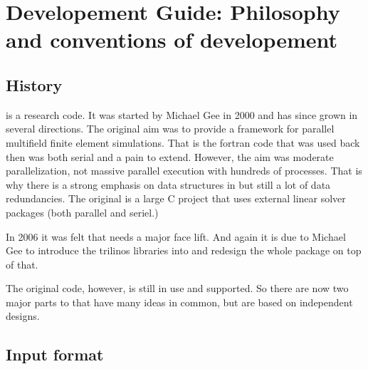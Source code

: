 
\makeatletter
\newenvironment{lyxcode}
{\begin{list}{}{
\setlength{\rightmargin}{\leftmargin}
\setlength{\listparindent}{0pt}%
\raggedright
\setlength{\itemsep}{0pt}
\setlength{\parsep}{0pt}
\normalfont\ttfamily}%
 \item[]}
{\end{list}}
\newenvironment{lyxlist}[1]
{\begin{list}{}
{\settowidth{\labelwidth}{#1}
 \setlength{\leftmargin}{\labelwidth}
 \addtolength{\leftmargin}{\labelsep}
 \renewcommand{\makelabel}[1]{##1\hfil}}}
{\end{list}}

\makeatother

\chapter[Developement Guide]{Developement Guide: Philosophy and conventions of \ccarat{} developement}

\section{History}

\ccarat{} is a research code. It was started by Michael Gee in 2000
and has since grown in several directions. The original aim was to
provide a framework for parallel multifield finite element simulations.
That is the fortran code that was used back then was both serial and
a pain to extend. However, the aim was moderate parallelization, not
massive parallel execution with hundreds of processes. That is why
there is a strong emphasis on data structures in \ccarat{} but still
a lot of data redundancies. The original \ccarat{} is a large C project
that uses external linear solver packages (both parallel and seriel.)

In 2006 it was felt that \ccarat{} needs a major face lift. And again
it is due to Michael Gee to introduce the trilinos libraries into
\ccarat{} and redesign the whole package on top of that.

The original code, however, is still in use and supported. So there
are now two major parts to \ccarat{} that have many ideas in common,
but are based on independent designs.

\section{Input format}

